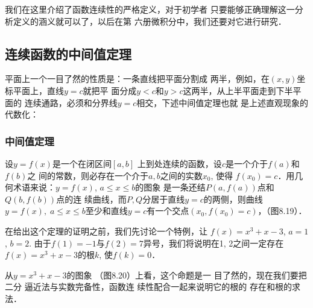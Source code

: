 我们在这里介绍了函数连续性的严格定义，对于初学者
只要能够正确理解这一分析定义的涵义就可以了，以后在第
六册微积分中，我们还要对它进行研究．

\subsection{连续函数的中间值定理}
平面上一个一目了然的性质是：一条直线把平面分割成
两半，例如，在$(x,y)$坐标平面上，直线$y=c$就把平
面分成$y<c$和$y>c$这两半，从上半平面走到下半平面的
连续通路，必须和分界线$y=c$相交，下述中间值定理也就
是上述直观现象的代数化：

\subsubsection{中间值定理}

设$y=f(x)$是一个在闭区间$[a,b]$
上到处连续的函数，设$c$是一个介于$f(a)$和$f(b)$之
间的常数，则必存在一个介于$a,b$之间的实数$x_0$, 使得
$f(x_0)=c$．用几何术语来说：$y=f(x)$, $a\le x\le b$的图象
是一条还结$P(a,f(a))$点和$Q(b,f(b))$点的连
续曲线，而$P,Q$分居于直线$y=c$的两侧，则曲线$y=
f(x),\; a\le x\le b$至少和直线$y=c$有一个交点$(x_0,
f(x_0)=c)$，（图8.19）．

\begin{figure}[htp]
    \centering
{}
    \caption{}
\end{figure}


在给出这个定理的证明之前，我们先讨论一个特例，让
$f(x)=x^3+x-3$, $a=1$, $b=2$. 由于$f(1)=-1$与$f(2)=7$异号，我们将说明在1,
2之间一定存在$f(x)=x^3+x-3$的根$k$, 使$f(k)=0$．

从$y=x^3+x-3$的图象
（图8.20）上看，这个命题是一
目了然的，现在我们要把二分
逼近法与实数完备性，函数连
续性配合一起来说明它的根的
存在和根的求法．

\begin{figure}[htp]
    \centering
{}
    \caption{}
\end{figure}


